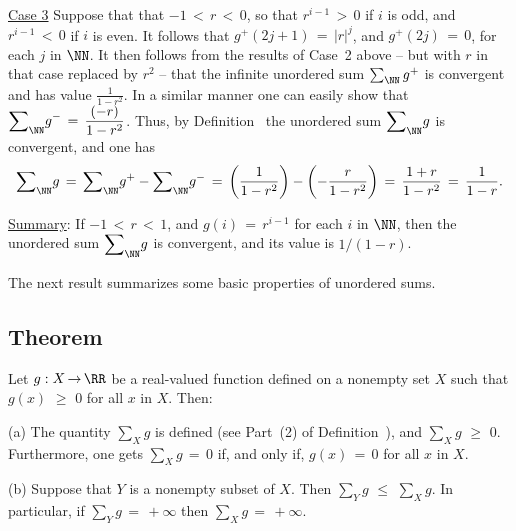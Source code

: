         \h \underline{Case 3} Suppose that that $-1\,<\,r\,<\,0$, so that $r^{i-1}\,>\,0$ if $i$ is odd, and $r^{i-1}\,<\,0$ if $i$ is even.
    It follows that $g^{+}\left(2j+1\right) \,=\, |r|^{j}$, and $g^{+}\left(2j\right) \,=\, 0$, for each $j$ in ${\NN}$.
    It then follows from the results of Case~2 above -- but with $r$ in that case replaced by $r^{2}$ --
    that the infinite unordered sum $\sum_{{\NN}} g^{+}$ is convergent and has value ${\displaystyle \frac{1}{1-r^{2}}}$.
    In a similar manner one can easily show that ${\displaystyle {\sum}_{{\NN}} g^{-} \,=\, \frac{(-r)}{1-r^{2}}}$.
    Thus, by Definition~ the unordered sum ${\displaystyle {\sum}_{{\NN}} g}$ is convergent, and one has
        \begin{displaymath}
        {\sum}_{{\NN}} g  \,=\, {\sum}_{{\NN}} g^{+} - {\sum}_{{\NN}} g^{-} \,=\, 
    \left(\frac{1}{1-r^{2}}\right) - \left(-\frac{r}{1-r^{2}}\right) \,=\, \frac{1+r}{1-r^{2}} \,=\, \frac{1}{1-r}.
        \end{displaymath}

        \underline{Summary}: If $-1\,<\,r\,<\,1$, and $g(i) \,=\, r^{i-1}$ for each $i$ in ${\NN}$,
    then the unordered sum ${\displaystyle {\sum}_{{\NN}} g}$ is convergent, and its value is $1/(1-r)$.

\V
\V

The next result summarizes some basic properties of unordered sums.

\V

            \subsection{\small{\bf Theorem}}
            \label{ThmG20.40}

        Let $g:X \,{\rightarrow}\, {\RR}$ be a real-valued function defined on a nonempty set $X$ such that $g(x)\,\,{\geq}\,\,0$ for all $x$ in $X$.
    Then:

\V

        (a) The quantity ${\sum}_{X} g$ is defined (see Part~(2) of Definition~), and ${\sum}_{X} g\,\,{\geq}\,\,0$.
    Furthermore, one gets ${\sum}_{X} g \,=\, 0$ if, and only if, $g(x) \,=\, 0$ for all $x$ in $X$.


\V

        (b) Suppose that $Y$ is a nonempty subset of $X$. Then ${\sum}_{Y} g\,\,{\leq}\,\,{\sum}_{X} g$.
    In particular, if ${\sum}_{Y} g \,=\, +{\infty}$ then ${\sum}_{X} g \,=\, +{\infty}$.

